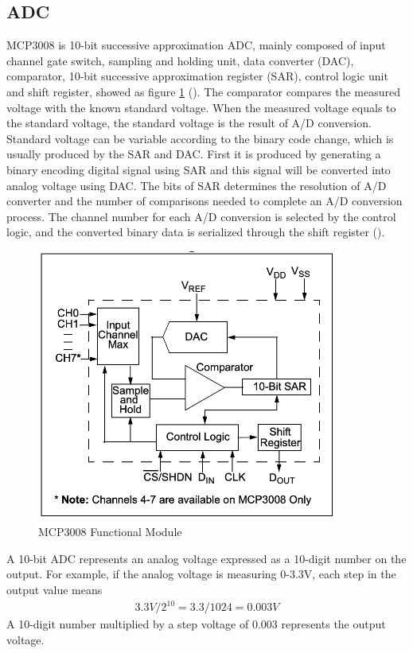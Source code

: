 \subsection{ADC}
MCP3008 is 10-bit successive approximation ADC, mainly composed of input channel gate switch, sampling and holding unit, data converter (DAC), comparator, 10-bit successive approximation register (SAR), control logic unit and shift register, showed as figure \ref{fig:ADC} (\cite{mcp3008}). The comparator compares the measured voltage with the known standard voltage. When the measured voltage equals to the standard voltage, the standard voltage is the result of A/D conversion. Standard voltage can be variable according to the binary code change, which is usually produced by the SAR and DAC. First it is produced by generating a binary encoding digital signal using SAR and this signal will be converted into analog voltage using DAC. The bits of SAR determines the resolution of A/D converter and the number of comparisons needed to complete an A/D conversion process. The channel number for each A/D conversion is selected by the control logic, and the converted binary data is serialized through the shift register (\cite{ADConverter}).
\begin{figure}[H]
    \centering
    \includegraphics[width=10cm]{figure/ADC.png}
    \caption{MCP3008 Functional Module}
    \label{fig:ADC}
\end{figure}
A 10-bit ADC represents an analog voltage expressed as a 10-digit number on the output. For example, if the analog voltage is measuring 0-3.3V, each step in the output value means 
\begin{align}
 3.3V /2^{10} = 3.3/1024 = 0.003V   
\end{align}
A 10-digit number multiplied by a step voltage of 0.003 represents the output voltage.

